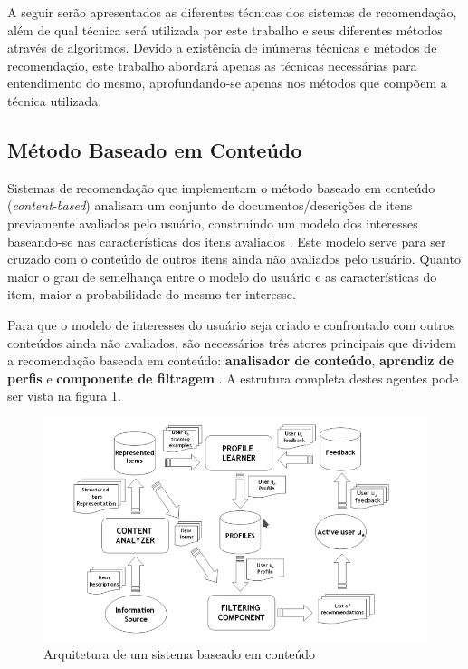 \documentclass[12pt, openright, oneside, a4paper, brazil]{abntex2}
\begin{document}
A seguir serão apresentados as diferentes técnicas dos sistemas de recomendação, além de qual técnica será utilizada por este trabalho e seus diferentes métodos através de algoritmos. Devido a existência de inúmeras técnicas e métodos de recomendação, este trabalho abordará apenas as técnicas necessárias para entendimento do mesmo, aprofundando-se apenas nos métodos que compõem a técnica utilizada.

\subsection{Método Baseado em Conteúdo}

Sistemas de recomendação que implementam o método baseado em conteúdo (\textit{content-based}) analisam um conjunto de documentos/descrições de itens previamente avaliados pelo usuário, construindo um modelo dos interesses baseando-se nas características dos itens avaliados \cite{mladenic1999text, adomavicius2005toward, lops2011content}. Este modelo serve para ser cruzado com o conteúdo de outros itens ainda não avaliados pelo usuário. Quanto maior o grau de semelhança entre o modelo do usuário e as características do item, maior a probabilidade do mesmo ter interesse.

Para que o modelo de interesses do usuário seja criado e confrontado com outros conteúdos ainda não avaliados, são necessários três atores principais que dividem a recomendação baseada em conteúdo: \textbf{analisador de conteúdo}, \textbf{aprendiz de perfis} e \textbf{componente de filtragem} \cite{lops2011content}. A estrutura completa destes agentes pode ser vista na figura 1.

\begin{figure}[h!tp]
	\caption{\label{content_based}Arquitetura de um sistema baseado em conteúdo}

	\begin{center}
		\includegraphics[scale=0.8]{images/content_based.png}
	\end{center}
\end{figure}
\end{document}
